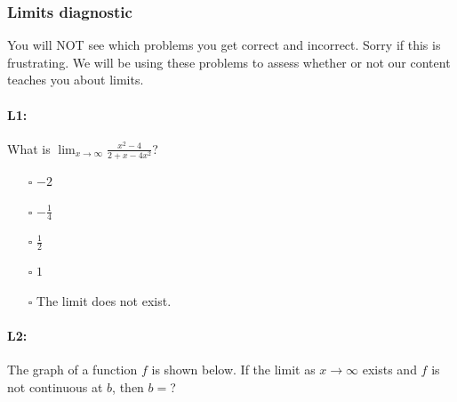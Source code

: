 \documentclass[pdftex, brazil, 12pt, twoside]{article}
\begin{document}
\subsubsection{Limits diagnostic}
\label{gs-adventure-limits}

You will NOT see which problems you get correct and incorrect. Sorry if this is frustrating. We will be using these problems to assess whether or not our content teaches you about limits.

\paragraph{L1:} What is $\displaystyle \lim_{x\to\infty} \frac{x^2-4}{2 + x - 4x^2}$?

\begin{itemize}
\item[$\square$] $-2$
\item[$\square$] $-\frac{1}{4}$
\item[$\square$] $\frac{1}{2}$
\item[$\square$] $1$
\item[$\square$] The limit does not exist.
\end{itemize}

\paragraph{L2:} The graph of a function $f$ is shown below. If the limit as $x\to\infty$ exists and $f$ is not continuous at $b$, then $b=$?

\begin{figure}[H]
  \begin{center}
    \label{fig:adv-l2}
  \end{center}
\end{figure}
\end{document}
